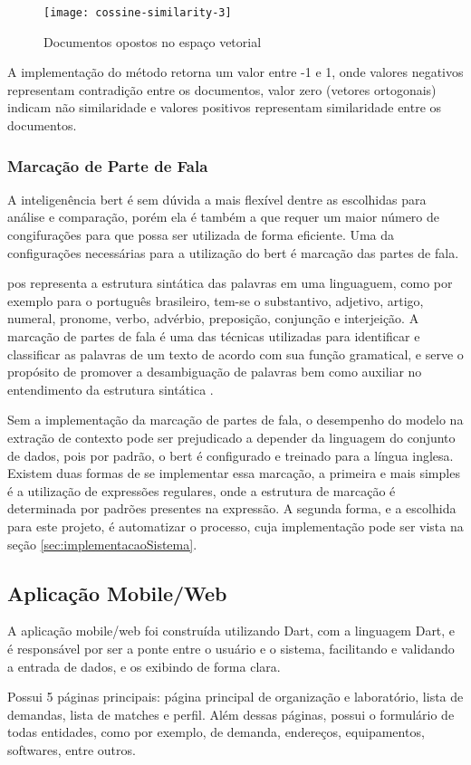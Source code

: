 \begin{figure}[htb]
    \caption{Documentos opostos no espaço vetorial}
    \texttt{[image: cossine-similarity-3]}
    \label{fig:cossine_similarity_3}
\end{figure}

A implementação do método retorna um valor entre -1 e 1, onde valores negativos representam contradição entre os documentos, valor zero (vetores ortogonais) indicam não similaridade e valores positivos representam similaridade entre os documentos.

\subsubsection{Marcação de Parte de Fala}\label{subsubsec:pos_tagging}

A inteligenência \gls{bert} é sem dúvida a mais flexível dentre as escolhidas para análise e comparação, porém ela é também a que requer um maior número de congifurações para que possa ser utilizada de forma eficiente. Uma da configurações necessárias para a utilização do \gls{bert} é marcação das partes de fala.

\gls{pos} representa a estrutura sintática das palavras em uma linguaguem, como por exemplo para o português brasileiro, tem-se o substantivo, adjetivo, artigo, numeral, pronome, verbo, advérbio, preposição, conjunção e interjeição. A marcação de partes de fala é uma das técnicas utilizadas para identificar e classificar as palavras de um texto de acordo com sua função gramatical, e serve o propósito de promover a desambiguação de palavras bem como auxiliar no entendimento da estrutura sintática \cite{JurafskyMartin2024}.

Sem a implementação da marcação de partes de fala, o desempenho do modelo na extração de contexto pode ser prejudicado a depender da linguagem do conjunto de dados, pois por padrão, o \gls{bert} é configurado e treinado para a língua inglesa. Existem duas formas de se implementar essa marcação, a primeira e mais simples é a utilização de expressões regulares, onde a estrutura de marcação é determinada por padrões presentes na expressão. A segunda forma, e a escolhida para este projeto, é automatizar o processo, cuja implementação pode ser vista na seção \ref{sec:implementacaoSistema}.

\subsection{Aplicação Mobile/Web}\label{subsec:app}

A aplicação mobile/web foi construída utilizando Dart, com a linguagem Dart, e é responsável por ser a ponte entre o usuário e o sistema, facilitando e validando a entrada de dados, e os exibindo de forma clara.

Possui 5 páginas principais: página principal de organização e laboratório, lista de demandas, lista de matches e perfil. Além dessas páginas, possui o formulário de todas entidades, como por exemplo, de demanda, endereços, equipamentos, softwares, entre outros.